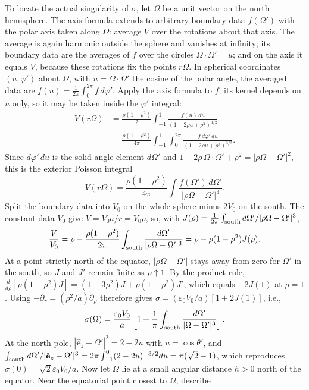 To locate the actual singularity of $\sigma$, let $\Omega$ be a unit
vector on the north hemisphere. The axis formula extends to arbitrary
boundary data $f(\Omega')$ with the polar axis taken along $\Omega$:
average $V$ over the rotations about that axis. The average is again
harmonic outside the sphere and vanishes at infinity; its boundary data
are the averages of $f$ over the circles $\Omega\cdot\Omega'=u$; and on
the axis it equals $V$, because these rotations fix the points
$r\Omega$. In spherical coordinates $(u,\varphi')$ about $\Omega$, with
$u=\Omega\cdot\Omega'$ the cosine of the polar angle, the averaged data
are $\bar f(u)=\frac1{2\pi}\int_0^{2\pi}f\,d\varphi'$. Apply the axis
formula to $\bar f$; its kernel depends on $u$ only, so it may be taken
inside the $\varphi'$ integral:
\begin{align*}
V(r\Omega)&=\frac{\rho(1-\rho^2)}2\int_{-1}^1
\frac{\bar f(u)\,du}{(1-2\rho u+\rho^2)^{3/2}}\\
&=\frac{\rho(1-\rho^2)}{4\pi}\int_{-1}^1\!\int_0^{2\pi}
\frac{f\,d\varphi'\,du}{(1-2\rho u+\rho^2)^{3/2}}.
\end{align*}
Since $d\varphi'\,du$ is the solid-angle element $d\Omega'$ and
$1-2\rho\,\Omega\cdot\Omega'+\rho^2=|\rho\Omega-\Omega'|^2$, this is
the exterior Poisson integral
\[
V(r\Omega)=\frac{\rho(1-\rho^2)}{4\pi}
\int\frac{f(\Omega')\,d\Omega'}{|\rho\Omega-\Omega'|^3}.
\]
Split the boundary data into $V_0$ on the whole
sphere minus $2V_0$ on the south. The constant data $V_0$ give
$V=V_0a/r=V_0\rho$, so, with
$J(\rho)=\frac1{2\pi}\int_{\rm south}d\Omega'/|\rho\Omega-\Omega'|^3$,
\[
\frac{V}{V_0}=\rho-\frac{\rho(1-\rho^2)}{2\pi}
\int_{\rm south}\frac{d\Omega'}{|\rho\Omega-\Omega'|^3}
=\rho-\rho(1-\rho^2)J(\rho).
\]
At a point strictly north of the equator, $|\rho\Omega-\Omega'|$ stays
away from zero for $\Omega'$ in the south, so $J$ and $J'$ remain
finite as $\rho\uparrow1$. By the product rule,
$\frac d{d\rho}[\rho(1-\rho^2)J]=(1-3\rho^2)J+\rho(1-\rho^2)J'$, which
equals $-2J(1)$ at $\rho=1$. Using
$-\partial_r=(\rho^2/a)\partial_\rho$ therefore gives
$\sigma=(\varepsilon_0V_0/a)[1+2J(1)]$, i.e.,
\[
\sigma(\Omega)=\frac{\varepsilon_0V_0}{a}
\left[1+\frac1\pi\int_{\rm south}
\frac{d\Omega'}{|\Omega-\Omega'|^3}\right].
\]
At the north pole, $|\hat{\mathbf e}_z-\Omega'|^2=2-2u$ with
$u=\cos\theta'$, and
$\int_{\rm south}d\Omega'/|\hat{\mathbf e}_z-\Omega'|^3
=2\pi\int_{-1}^0(2-2u)^{-3/2}du=\pi(\sqrt2-1)$, which reproduces
$\sigma(0)=\sqrt2\varepsilon_0V_0/a$.
Now let $\Omega$ lie at a small angular distance $h>0$ north of the
equator. Near the equatorial point closest to $\Omega$, describe

